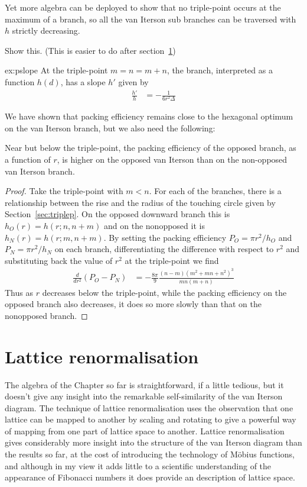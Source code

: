 Yet more algebra can be deployed to show that no triple-point occurs at the maximum of a branch, so all the van Iterson sub branches can be traversed with $h$ strictly decreasing. 
\begin{jExercise}\label{ex:pslope}
Show this. (This is easier to do after section~\ref{sec:renormalisation})
\end{jExercise}
\begin{jAnswer}{ex:pslope}{
		At the triple-point  $m=n=m+n$, the  branch, interpreted as a function $h(d)$, has a slope $h'$ given by 
		\begin{align}
			\frac{h'}{h} &= - \frac{1}{6 r^2 \Delta}
\end{align}}
\end{jAnswer}
We have shown that packing efficiency remains close to the hexagonal optimum on the van Iterson branch, but we also need the following:
\begin{theorem}
	Near but below the triple-point, the packing efficiency of the opposed branch, as a function of $r$, is higher on the opposed van Iterson than on the non-opposed van Iterson branch.
\end{theorem}
\begin{proof}
	Take the triple-point  with $m<n$. For each of the branches, there is a relationship between the rise and the radius of the touching circle given by Section~\ref{sec:triplep}. On the 
	opposed downward branch  this is $h_O(r)= h(r;n,n+m)$ and on the nonopposed   it is $h_N(r)=h(r;m,n+m)$. By setting the 
	packing efficiency  $P_O=\pi r^2/h_O$ and $P_N=\pi r^2/h_N$ on each branch, differentiating the difference with respect to $r^2$ and substituting back the value of $r^2$ at the triple-point we find
	\begin{align}
		\frac{d}{dr^2}(P_O-P_N) &= - \frac{8\pi}{9}\frac{(n- m )  (m^2+m n+n^2)^3}{mn(m+n)}
	\end{align}
	Thus as $r$ decreases below the triple-point, while the packing efficiency on the opposed branch also decreases, it does so more slowly than that on the nonopposed branch.  
\end{proof}




\section{Lattice renormalisation}
\label{sec:renormalisation}
The algebra of the Chapter so far is straightforward, if a little tedious, but it doesn't give any insight into the remarkable self-similarity of the van Iterson diagram. The technique of lattice renormalisation uses the observation that one lattice can be mapped to another by scaling and rotating to give a powerful way of mapping from one part of lattice space to another. Lattice renormalisation gives considerably more insight into the structure of the van Iterson diagram than the results so far, at the cost of introducing the technology of M{\"obius} functions, and although in my view it adds little to a scientific understanding of the appearance of Fibonacci numbers it does provide an   description of lattice space.
\label{sec:levitov}

